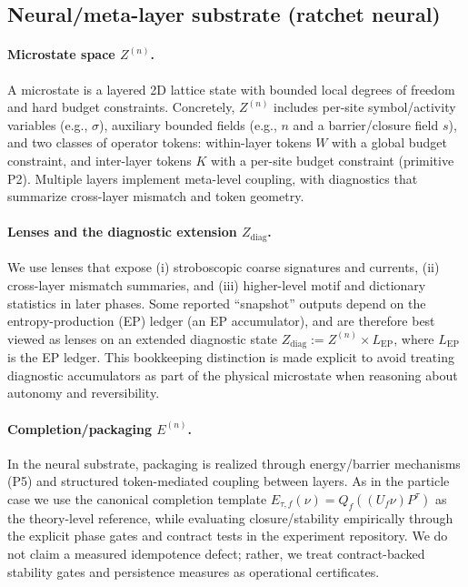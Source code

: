 \documentclass[11pt]{article}
\begin{document}
\subsection{Neural/meta-layer substrate (ratchet neural)}\label{sec:inst:neural}
\paragraph{Microstate space $Z^{(n)}$.}
A microstate is a layered 2D lattice state with bounded local degrees of freedom and hard budget constraints. Concretely, $Z^{(n)}$ includes per-site symbol/activity variables (e.g., $\sigma$), auxiliary bounded fields (e.g., $n$ and a barrier/closure field $s$), and two classes of operator tokens: within-layer tokens $W$ with a global budget constraint, and inter-layer tokens $K$ with a per-site budget constraint (primitive P2). Multiple layers implement meta-level coupling, with diagnostics that summarize cross-layer mismatch and token geometry.

\paragraph{Lenses and the diagnostic extension $Z_{\mathrm{diag}}$.}
We use lenses that expose (i) stroboscopic coarse signatures and currents, (ii) cross-layer mismatch summaries, and (iii) higher-level motif and dictionary statistics in later phases. Some reported ``snapshot'' outputs depend on the entropy-production (EP) ledger (an EP accumulator), and are therefore best viewed as lenses on an extended diagnostic state $Z_{\mathrm{diag}}:=Z^{(n)}\times L_{\mathrm{EP}}$, where $L_{\mathrm{EP}}$ is the EP ledger. This bookkeeping distinction is made explicit to avoid treating diagnostic accumulators as part of the physical microstate when reasoning about autonomy and reversibility.

\paragraph{Completion/packaging $E^{(n)}$.}
In the neural substrate, packaging is realized through energy/barrier mechanisms (P5) and structured token-mediated coupling between layers. As in the particle case we use the canonical completion template $E_{\tau,f}(\nu)=Q_f((U_f\nu)P^\tau)$ as the theory-level reference, while evaluating closure/stability empirically through the explicit phase gates and contract tests in the experiment repository. We do not claim a measured idempotence defect; rather, we treat contract-backed stability gates and persistence measures as operational certificates.
\end{document}
